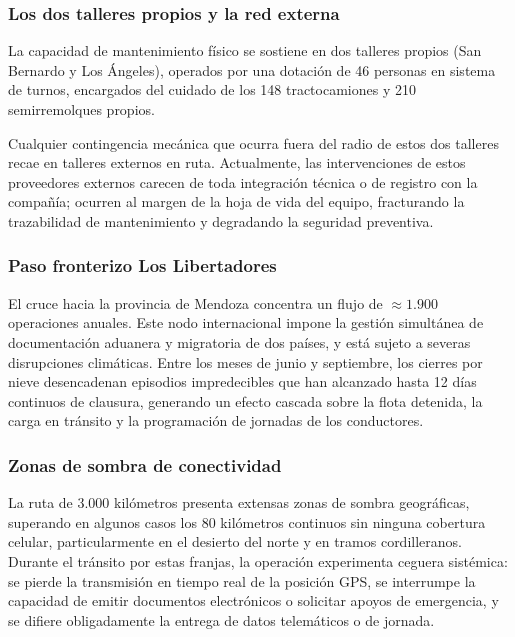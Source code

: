 \subsubsection{Los dos talleres propios y la red externa}

La capacidad de mantenimiento físico se sostiene en dos talleres propios (San Bernardo y Los Ángeles), operados por una dotación de 46 personas en sistema de turnos, encargados del cuidado de los 148 tractocamiones y 210 semirremolques propios.

Cualquier contingencia mecánica que ocurra fuera del radio de estos dos talleres recae en talleres externos en ruta. Actualmente, las intervenciones de estos proveedores externos carecen de toda integración técnica o de registro con la compañía; ocurren al margen de la hoja de vida del equipo, fracturando la trazabilidad de mantenimiento y degradando la seguridad preventiva.

\subsubsection{Paso fronterizo Los Libertadores}

El cruce hacia la provincia de Mendoza concentra un flujo de $\approx 1.900$ operaciones anuales. Este nodo internacional impone la gestión simultánea de documentación aduanera y migratoria de dos países, y está sujeto a severas disrupciones climáticas. Entre los meses de junio y septiembre, los cierres por nieve desencadenan episodios impredecibles que han alcanzado hasta 12 días continuos de clausura, generando un efecto cascada sobre la flota detenida, la carga en tránsito y la programación de jornadas de los conductores.

\subsubsection{Zonas de sombra de conectividad}

La ruta de 3.000 kilómetros presenta extensas zonas de sombra geográficas, superando en algunos casos los 80 kilómetros continuos sin ninguna cobertura celular, particularmente en el desierto del norte y en tramos cordilleranos. Durante el tránsito por estas franjas, la operación experimenta ceguera sistémica: se pierde la transmisión en tiempo real de la posición GPS, se interrumpe la capacidad de emitir documentos electrónicos o solicitar apoyos de emergencia, y se difiere obligadamente la entrega de datos telemáticos o de jornada.

